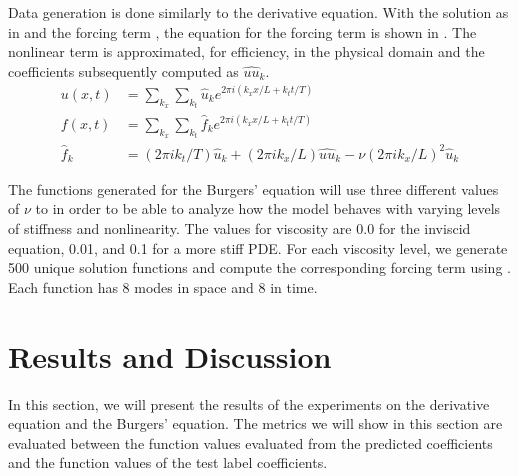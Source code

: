 \documentclass[preprint,12pt,times,authoryear]{elsarticle}
\begin{document}
Data generation is done similarly to the derivative equation. With the solution as in  and the forcing term , the equation for the forcing term is shown in . The nonlinear term is approximated, for efficiency, in the physical domain and the coefficients subsequently computed as \(\hat{uu}_k\).
\begin{align}
  u\left(x, t \right) & = \sum_{k_{x}} \sum_{k_{t}} \hat{u}_k e^{2\pi i(k_{x}x/L+k_{t}t/T)} \label{eq:fourier_field}                                         \\
  f\left(x, t \right) & = \sum_{k_{x}}\sum_{k_{t}} \hat{f}_k e^{2\pi i(k_{x}x/L+k_{t}t/T)} \label{eq:fourier_force}                                          \\
  \hat{f}_k           & = (2\pi i k_{t}/T) \hat{u}_k + (2\pi i k_{x}/L)\hat{uu}_k - \nu{(2\pi i k_{x}/L)}^2\hat{u}_k \label{eq:forced_viscous_burgers_coeff}
\end{align}

The functions generated for the Burgers' equation will use three different values of \(\nu{}\) to in order to be able to analyze how the model behaves with varying levels of stiffness and nonlinearity. The values for viscosity are \num{0.0} for the inviscid equation, \num{0.01}, and \num{0.1} for a more stiff PDE\@. For each viscosity level, we generate \num{500} unique solution functions and compute the corresponding forcing term using . Each function has 8 modes in space and 8 in time.


\section{Results and Discussion}
In this section, we will present the results of the experiments on the derivative equation and the Burgers' equation. The metrics we will show in this section are evaluated between the function values evaluated from the predicted coefficients and the function values of the test label coefficients.
\end{document}
